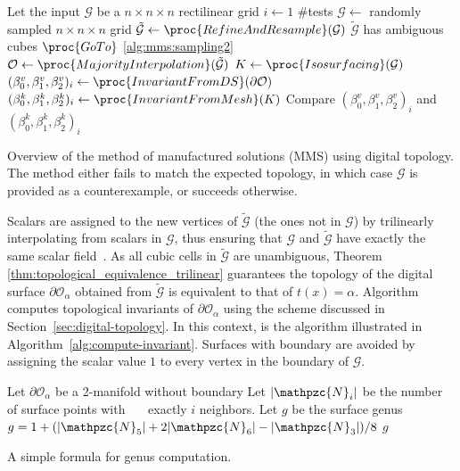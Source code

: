 \begin{algorithm}[t]
\begin{codebox}
\li \Comment Let the input $\mathcal{G}$ be a $n \times n \times n$ rectilinear grid
\li \For $i \gets 1$ \To $\#$tests
\li     \Do  $\mathcal{G} \gets$ randomly sampled $n \times n \times n$ grid \label{alg:mms:sampling2}
\li         $\tilde{\mathcal{G}} \gets \proc{RefineAndResample}(\mathcal{G})$
\li         \If $\tilde{\mathcal{G}}$ has ambiguous cubes
\li         	\Then $\proc{GoTo}$ \ref{alg:mms:sampling2} \label{alg:mms:goto-dt}
			\End
\li         $\mathcal{O} \gets
\proc{MajorityInterpolation}(\tilde{\mathcal{G}})$
\li 		  $K \gets \proc{Isosurfacing}(\mathcal{G})$
\li         	  $(\beta_0^v, \beta_1^v,\beta_2^v)_i \gets
\proc{InvariantFromDS}(\partial {\mathcal{O}})$
\li         	  $(\beta_0^k, \beta_1^k,\beta_2^k)_i \gets
\proc{InvariantFromMesh}(K)$
\li Compare $(\beta_0^v, \beta_1^v,\beta_2^v)_i$ and $(\beta_0^k, \beta_1^k,\beta_2^k)_i$
	    \End
      \End
\end{codebox}
\caption{Overview of the method of manufactured solutions (MMS) using digital
topology. The method either fails to match the expected topology, in
which case $\mathcal{G}$  is provided as a counterexample, or
succeeds otherwise.}
\label{alg:manufactured-solutions-digital-surfaces}
\end{algorithm}

Scalars are assigned to the new vertices of $\tilde{\mathcal{G}}$ (the ones not in $\mathcal{G}$) by trilinearly 
interpolating
from scalars in $\mathcal{G}$, thus ensuring that $\mathcal{G}$ and  $\tilde{\mathcal{G}}$ have
exactly the same scalar field~\cite{Nielson03onmarching}.
As all cubic cells in $\tilde{\mathcal{G}}$ are unambiguous, Theorem \ref{thm:topological_equivalence_trilinear} guarantees 
the topology of the digital surface $\partial\mathcal{O}_\alpha$
obtained from $\tilde{\mathcal{G}}$ is equivalent to 
that of $t(x)=\alpha$. Algorithm  computes
topological invariants of
$\partial\mathcal{O}_\alpha$ using the scheme discussed in
Section~\ref{sec:digital-topology}. In this context,  is
the algorithm illustrated in Algorithm~\ref{alg:compute-invariant}.
Surfaces with boundary are avoided by assigning the scalar value $1$ to every vertex in the
boundary of $\mathcal{G}$.

\begin{algorithm}[b]
\begin{codebox}
\li \Comment Let $\partial \mathcal{O}_\alpha$ be a 2-manifold without
boundary
\li \Comment Let $|\mathpzc{N}_i|$ be the number of surface points with
\zi ~~~exactly $i$ neighbors.
\li \Comment Let $g$ be the surface genus
\li $g = 1 + (|\mathpzc{N}_5| + 2 |\mathpzc{N}_6| - |\mathpzc{N}_3|) / 8 $
\li \Return $g$
\end{codebox}
\caption{A simple formula for genus computation.}
\label{alg:compute-invariant}
\end{algorithm}



